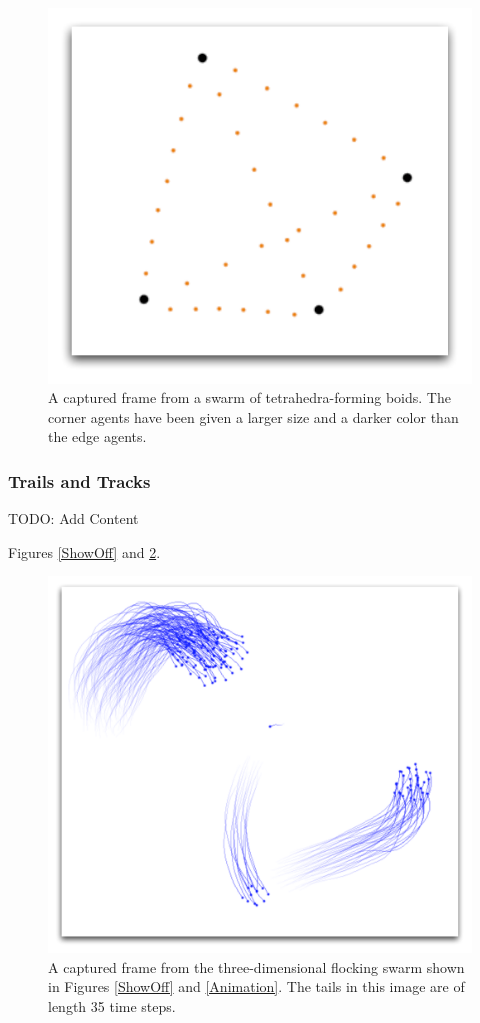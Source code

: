 \documentclass[conference]{IEEEtran}
\begin{document}
\begin{figure}
\centering
\includegraphics[scale=.5]{images/sizeandcolor.pdf}
\caption{
A captured frame from a swarm of tetrahedra-forming boids.
The corner agents have been given a larger size and a darker color than the edge agents.}
\label{SizeAndColor}
\end{figure}


\subsubsection{Trails and Tracks}

TODO: Add Content

Figures \ref{ShowOff} and \ref{Trails}.

\begin{figure}
\centering
\includegraphics[scale=.4]{images/trails.pdf}
\caption{
A captured frame from the three-dimensional flocking swarm shown in Figures \ref{ShowOff} and \ref{Animation}.
The tails in this image are of length 35 time steps.}
\label{Trails}
\end{figure}
\end{document}
